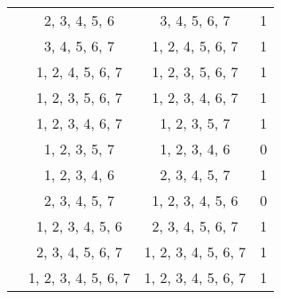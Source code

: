 \begin{solution}
\begin{enumerate}[(a)]
\begin{multicols}{3}
\begin{tabular}[t]{c c|c r}
            & 2, 3, 4, 5, 6 & 3, 4, 5, 6, 7 & 1\\
            & 3, 4, 5, 6, 7 & 1, 2, 4, 5, 6, 7 & 1\\
            & 1, 2, 4, 5, 6, 7 & 1, 2, 3, 5, 6, 7 & 1\\
            & 1, 2, 3, 5, 6, 7 & 1, 2, 3, 4, 6, 7 & 1\\
            & 1, 2, 3, 4, 6, 7 & 1, 2, 3, 5, 7 & 1\\
            & 1, 2, 3, 5, 7 & 1, 2, 3, 4, 6 & 0\\
            & 1, 2, 3, 4, 6 & 2, 3, 4, 5, 7 & 1\\
            & 2, 3, 4, 5, 7 & 1, 2, 3, 4, 5, 6 & 0\\
            & 1, 2, 3, 4, 5, 6 & 2, 3, 4, 5, 6, 7 & 1\\
            & 2, 3, 4, 5, 6, 7 & 1, 2, 3, 4, 5, 6, 7 & 1\\
            & 1, 2, 3, 4, 5, 6, 7 & 1, 2, 3, 4, 5, 6, 7 & 1\\
        \end{tabular}
\end{multicols}
\end{enumerate}
\end{solution}

